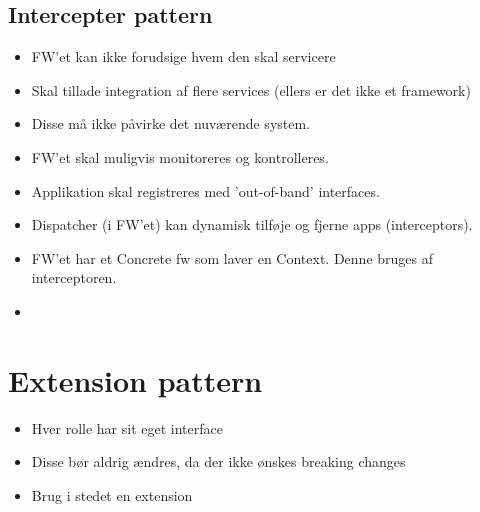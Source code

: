 \documentclass[oneside, 10pt]{memoir}
\begin{document}
\subsection*{Intercepter pattern}
\begin{itemize}
	\item FW'et kan ikke forudsige hvem den skal servicere

	\item Skal tillade integration af flere services (ellers er det ikke et framework)

	\item Disse må ikke påvirke det nuværende system.

	\item FW'et skal muligvis monitoreres og kontrolleres.

	\item Applikation skal registreres med 'out-of-band' interfaces.

	\item Dispatcher (i FW'et) kan dynamisk tilføje og fjerne apps (interceptors).

	\item FW'et har et Concrete fw som laver en Context. Denne bruges af interceptoren.

	\item 
\end{itemize}


\section*{Extension pattern}
\begin{itemize}
	\item Hver rolle har sit eget interface

	\item Disse bør aldrig ændres, da der ikke ønskes breaking changes

	\item Brug i stedet en extension
\end{itemize}
\end{document}
